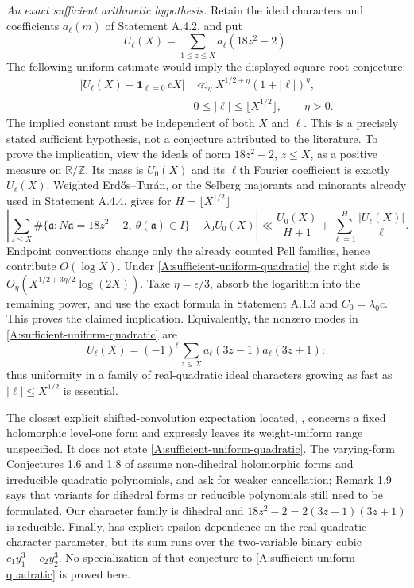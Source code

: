 \emph{An exact sufficient arithmetic hypothesis.}
Retain the ideal characters and coefficients $a_\ell(m)$ of
Statement A.4.2, and put
\[
 U_\ell(X)=\sum_{1\leq z\leq X}a_\ell(18z^2-2).
\]
The following uniform estimate would imply the displayed
square-root conjecture:
\begin{equation}\label{A:sufficient-uniform-quadratic}
 \begin{aligned}
 \left|U_\ell(X)-\mathbf1_{\ell=0}\,cX\right|
 &\ll_\eta X^{1/2+\eta}(1+|\ell|)^\eta,\\
 &0\leq|\ell|\leq\lfloor X^{1/2}\rfloor,\qquad \eta>0.
 \end{aligned}
\end{equation}
The implied constant must be independent of both $X$ and $\ell$.
This is a precisely stated sufficient hypothesis, not a conjecture
attributed to the literature. To prove the implication, view the
ideals of norm $18z^2-2$, $z\leq X$, as a positive measure on
$\mathbb R/\mathbb Z$. Its mass is $U_0(X)$ and its $\ell$th
Fourier coefficient is exactly $U_\ell(X)$. Weighted
Erd\H{o}s--Tur\'an, or the Selberg majorants and minorants already
used in Statement A.4.4, gives for $H=\lfloor X^{1/2}\rfloor$
\[
 \left|\sum_{z\leq X}\#\{\mathfrak a:
 N\mathfrak a=18z^2-2,\ \theta(\mathfrak a)\in I\}
       -\lambda_0 U_0(X)\right|
 \ll \frac{U_0(X)}{H+1}
       +\sum_{\ell=1}^{H}\frac{|U_\ell(X)|}{\ell}.
\]
Endpoint conventions change only the already counted Pell
families, hence contribute $O(\log X)$.
Under \eqref{A:sufficient-uniform-quadratic} the right side is
$O_\eta(X^{1/2+3\eta/2}\log(2X))$.
Take $\eta=\epsilon/3$, absorb the logarithm into the remaining
power, and use the exact formula in Statement A.1.3 and
$C_0=\lambda_0c$. This proves the claimed implication. Equivalently,
the nonzero modes in \eqref{A:sufficient-uniform-quadratic} are
\[
 U_\ell(X)=(-1)^\ell
       \sum_{z\leq X}a_\ell(3z-1)a_\ell(3z+1);
\]
thus uniformity in a family of real-quadratic ideal characters
growing as fast as $|\ell|\leq X^{1/2}$ is essential.

The closest explicit shifted-convolution expectation located,
\cite[equation (2) and the paragraph immediately after it]
{NordentoftPetridisRisager2022}, concerns a fixed holomorphic
level-one form and expressly leaves its weight-uniform range
unspecified. It does not state
\eqref{A:sufficient-uniform-quadratic}.
The varying-form Conjectures 1.6 and 1.8 of
\cite{Nelson2022Quadratic} assume non-dihedral holomorphic forms
and irreducible quadratic polynomials, and ask for weaker
cancellation; Remark 1.9 says that variants for dihedral forms
or reducible polynomials still need to be formulated.
Our character family is dihedral and
$18z^2-2=2(3z-1)(3z+1)$ is reducible.
Finally, \cite[Conjecture $C_a(\epsilon)$]{Merikoski2025Primes}
has explicit epsilon dependence on the real-quadratic character
parameter, but its sum runs over the two-variable binary cubic
$c_1y_1^3-c_2y_2^3$. No specialization of that conjecture to
\eqref{A:sufficient-uniform-quadratic} is proved here.

